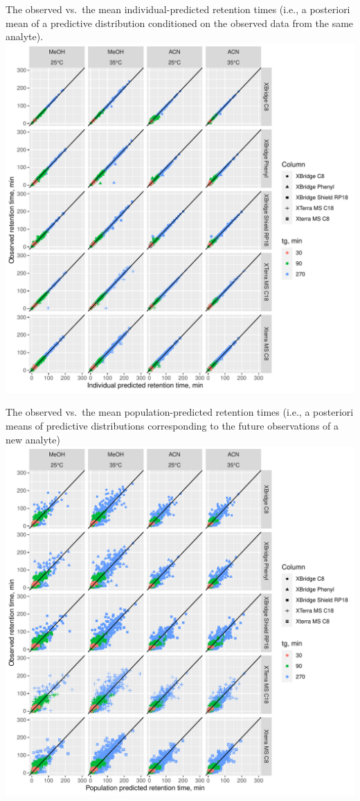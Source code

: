 \documentclass[
]{article}
\begin{document}
\newpage{}

The observed vs.~the mean individual-predicted retention times (i.e., a
posteriori mean of a predictive distribution conditioned on the observed
data from the same analyte).
\includegraphics{../figures/concordanceplots/individual.pdf}

\newpage{}

The observed vs.~the mean population-predicted retention times (i.e., a
posteriori means of predictive distributions corresponding to the future
observations of a new analyte)
\includegraphics{../figures/concordanceplots/population.pdf}
\end{document}
